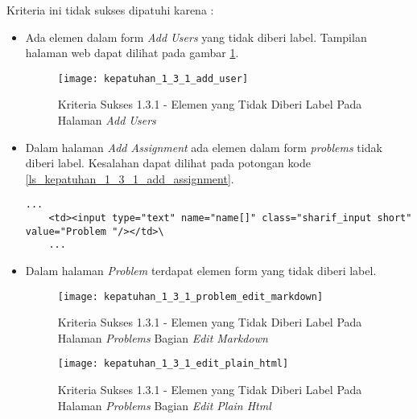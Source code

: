 Kriteria ini tidak sukses dipatuhi karena :
\begin{itemize}
	\item Ada elemen dalam form \textit{Add Users} yang tidak diberi label. Tampilan halaman web dapat dilihat pada gambar \ref{fig:kepatuhan_1_3_1_add_user}.
	\begin{figure}[H]
		\centering  
		\texttt{[image: kepatuhan\_1\_3\_1\_add\_user]}  
		\caption[Kriteria Sukses 1.3.1 - Elemen yang Tidak Diberi Label Pada Halaman \textit{Add Users}]{Kriteria Sukses 1.3.1 - Elemen yang Tidak Diberi Label Pada Halaman \textit{Add Users}} 
		\label{fig:kepatuhan_1_3_1_add_user} 
	\end{figure}
	\item Dalam halaman \textit{Add Assignment} ada elemen dalam form \textit{problems} tidak diberi label. Kesalahan dapat dilihat pada potongan kode \ref{ls_kepatuhan_1_3_1_add_assignment}.
	\begin{lstlisting}[basicstyle=\ttfamily, frame=single,
	columns=fullflexible, keepspaces=true, breaklines=true, label=ls_kepatuhan_1_3_1_add_assignment, caption=Kriteria Sukses 1.3.1 - Elemen Dalam Form yang Tidak Diberi Label]
	...
	<td><input type="text" name="name[]" class="sharif_input short" value="Problem "/></td>\
	...
	\end{lstlisting}
	
	\item Dalam halaman \textit{Problem} terdapat elemen form yang tidak diberi label.
	\begin{figure}[H]
		\centering  
		\texttt{[image: kepatuhan\_1\_3\_1\_problem\_edit\_markdown]}  
		\caption[Kriteria Sukses 1.3.1 - Elemen yang Tidak Diberi Label Pada Halaman \textit{Problems} Bagian \textit{Edit Markdown}]{Kriteria Sukses 1.3.1 - Elemen yang Tidak Diberi Label Pada Halaman \textit{Problems} Bagian \textit{Edit Markdown}} 
		\label{fig:kepatuhan_1_3_1_problem_edit_markdown} 
	\end{figure}
	\begin{figure}[H]
		\centering  
		\texttt{[image: kepatuhan\_1\_3\_1\_edit\_plain\_html]}  
		\caption[Kriteria Sukses 1.3.1 - Elemen yang Tidak Diberi Label Pada Halaman \textit{Problems} Bagian \textit{Edit Plain Html}]{Kriteria Sukses 1.3.1 - Elemen yang Tidak Diberi Label Pada Halaman \textit{Problems} Bagian \textit{Edit Plain Html}} 
		\label{fig:kepatuhan_1_3_1_plain_html} 
	\end{figure}
\end{itemize}

